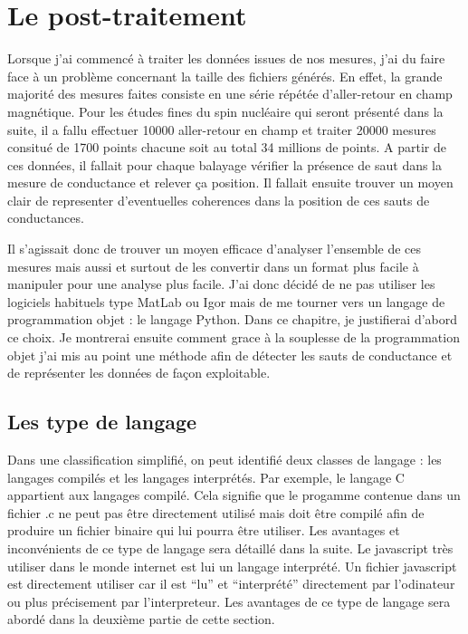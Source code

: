\chapter{Le post-traitement}

Lorsque j'ai commencé à traiter les données issues de nos mesures, j'ai du faire face à un problème concernant la taille des fichiers générés. En effet, la grande majorité des mesures faites consiste en une série répétée d'aller-retour en champ magnétique. Pour les études fines du spin nucléaire qui seront présenté dans la suite, il a fallu effectuer 10000 aller-retour en champ et traiter 20000 mesures consitué de 1700 points chacune soit au total 34 millions de points. A partir de ces données, il fallait pour chaque balayage vérifier la présence de saut dans la mesure de conductance et relever ça position. Il fallait ensuite trouver un moyen clair de representer d'eventuelles coherences dans la position de ces sauts de conductances.

Il s'agissait donc de trouver un moyen efficace d'analyser l'ensemble de ces mesures mais aussi et surtout de les convertir dans un format plus facile à manipuler pour une analyse plus facile. J'ai donc décidé de ne pas utiliser les logiciels habituels type MatLab ou Igor mais de me tourner vers un langage de programmation objet : le langage Python. Dans ce chapitre, je justifierai d'abord ce choix. Je montrerai ensuite comment grace à la souplesse de la programmation objet j'ai mis au point une méthode afin de détecter les sauts de conductance et de représenter les données de façon exploitable.


\section{Les type de langage}
Dans une classification simplifié, on peut identifié deux classes de langage : les langages compilés et les langages interprétés. Par exemple, le langage C appartient aux langages compilé. Cela signifie que le progamme contenue dans un fichier .c ne peut pas être directement utilisé mais doit être compilé afin de produire un fichier binaire qui lui pourra être utiliser. Les avantages et inconvénients de ce type de langage sera détaillé dans la suite. Le javascript très utiliser dans le monde internet est lui un langage interprété. Un fichier javascript est directement utiliser car il est ``lu'' et ``interprété'' directement par l'odinateur ou plus précisement par l'interpreteur. Les avantages de ce type de langage sera abordé dans la deuxième partie de cette section.

